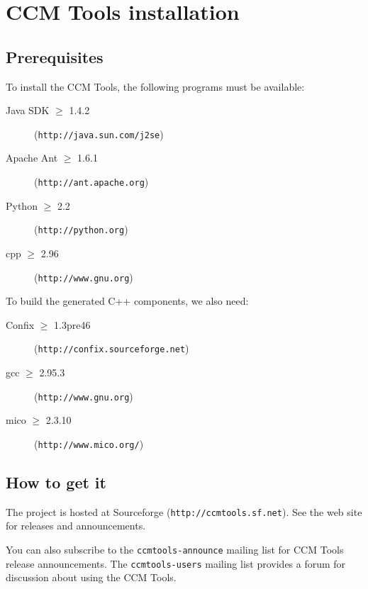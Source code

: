 \section{CCM Tools installation}

\subsection{Prerequisites}

To install the CCM Tools, the following programs must be available:
\begin{description}
\item [Java SDK $\ge$ 1.4.2] ({\tt http://java.sun.com/j2se})
\item [Apache Ant $\ge$ 1.6.1] ({\tt http://ant.apache.org})
\item [Python $\ge$ 2.2] ({\tt http://python.org})
\item [cpp $\ge$ 2.96] ({\tt http://www.gnu.org})
\end{description}

To build the generated C++ components, we also need:
\begin{description}
\item [Confix $\ge$ 1.3pre46] ({\tt http://confix.sourceforge.net})
\item [gcc $\ge$ 2.95.3] ({\tt http://www.gnu.org})
\item [mico $\ge$ 2.3.10] ({\tt http://www.mico.org/})
\end{description}


\subsection{How to get it}

The project is hosted at Sourceforge ({\tt http://ccmtools.sf.net}). See the web
site for releases and announcements.

You can also subscribe to the {\tt ccmtools-announce} mailing list for CCM Tools
release announcements. The {\tt ccmtools-users} mailing list provides a forum
for discussion about using the CCM Tools.


